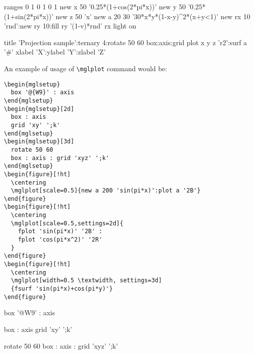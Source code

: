 \documentclass{article}
\begin{document}
\begin{mglverbatim}
  ranges 0 1 0 1 0 1
  new x 50 '0.25*(1+cos(2*pi*x))'
  new y 50 '0.25*(1+sin(2*pi*x))'
  new z 50 'x'
  new a 20 30 '30*x*y*(1-x-y)^2*(x+y<1)'
  new rx 10 'rnd':new ry 10:fill ry '(1-v)*rnd' rx
  light on
  
  title 'Projection sample':ternary 4:rotate 50 60
  box:axis:grid
  plot x y z 'r2':surf a '#'
  xlabel 'X':ylabel 'Y':zlabel 'Z'
\end{mglverbatim}


An example of usage of \texttt{\textbackslash{}mglplot} command would be:
\begin{verbatim}
\begin{mglsetup}
  box '@{W9}' : axis
\end{mglsetup}
\begin{mglsetup}[2d]
  box : axis
  grid 'xy' ';k'
\end{mglsetup}
\begin{mglsetup}[3d]
  rotate 50 60
  box : axis : grid 'xyz' ';k'
\end{mglsetup}
\begin{figure}[!ht]
  \centering
  \mglplot[scale=0.5]{new a 200 'sin(pi*x)':plot a '2B'}
\end{figure}
\begin{figure}[!ht]
  \centering
  \mglplot[scale=0.5,settings=2d]{
    fplot 'sin(pi*x)' '2B' :
    fplot 'cos(pi*x^2)' '2R'
  }
\end{figure}
\begin{figure}[!ht]
  \centering
  \mglplot[width=0.5 \textwidth, settings=3d]
  {fsurf 'sin(pi*x)+cos(pi*y)'}
\end{figure}
\end{verbatim}

\begin{mglsetup}
  box '@{W9}' : axis
\end{mglsetup}
\begin{mglsetup}[2d]
  box : axis
  grid 'xy' ';k'
\end{mglsetup}
\begin{mglsetup}[3d]
  rotate 50 60
  box : axis : grid 'xyz' ';k'
\end{mglsetup}
\begin{figure}[!ht]
  \centering
\end{figure}
\begin{figure}[!ht]
  \centering
\end{figure}
\begin{figure}[!ht]
  \centering
\end{figure}
\end{document}
